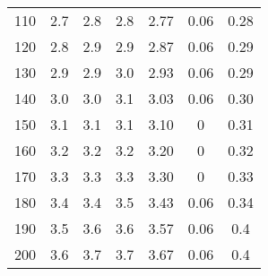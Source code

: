 \begin{table}[H]
\begin{tabular}{
      S[table-format=3.0] 
      S[table-format=1.2] S[table-format=1.1] S[table-format=1.1]
      S[table-format=1.3] S[table-format=1.3] S[table-format=1.2]
      }
      110 & 2.7 & 2.8 & 2.8 & 2.77  & 0.06  & 0.28 \\
      120 & 2.8 & 2.9 & 2.9 & 2.87  & 0.06  & 0.29 \\
      130 & 2.9 & 2.9 & 3.0 & 2.93  & 0.06  & 0.29 \\
      140 & 3.0 & 3.0 & 3.1 & 3.03  & 0.06  & 0.30 \\
      150 & 3.1 & 3.1 & 3.1 & 3.10  & 0     & 0.31 \\
      160 & 3.2 & 3.2 & 3.2 & 3.20  & 0     & 0.32 \\
      170 & 3.3 & 3.3 & 3.3 & 3.30  & 0     & 0.33 \\
      180 & 3.4 & 3.4 & 3.5 & 3.43  & 0.06  & 0.34 \\
      190 & 3.5 & 3.6 & 3.6 & 3.57  & 0.06  & 0.4  \\
      200 & 3.6 & 3.7 & 3.7 & 3.67  & 0.06  & 0.4  \\
      \bottomrule
    \end{tabular}
\end{table}
%
